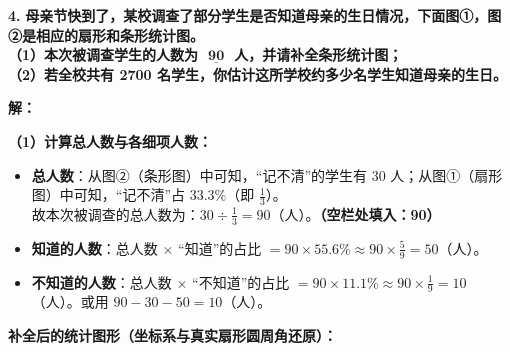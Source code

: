 \vspace{0.6cm}

\textbf{\LARGE 4.} \textbf{母亲节快到了，某校调查了部分学生是否知道母亲的生日情况，下面图①，图②是相应的扇形和条形统计图。\\
（1）本次被调查学生的人数为 $\underline{\textbf{    90    }}$ 人，并请补全条形统计图；\\
（2）若全校共有 2700 名学生，你估计这所学校约多少名学生知道母亲的生日。}

\vspace{0.4cm}
\textbf{解：}

\textbf{（1）计算总人数与各细项人数：}
\begin{itemize}
    \item \textbf{总人数}：从图②（条形图）中可知，“记不清”的学生有 $30$ 人；从图①（扇形图）中可知，“记不清”占 $33.3\%$（即 $\frac{1}{3}$）。\\
    故本次被调查的总人数为：$30 \div \frac{1}{3} = 90$（人）。\textbf{（空栏处填入：90）}
    \item \textbf{知道的人数}：总人数 $\times$ “知道”的占比 $= 90 \times 55.6\% \approx 90 \times \frac{5}{9} = 50$（人）。
    \item \textbf{不知道的人数}：总人数 $\times$ “不知道”的占比 $= 90 \times 11.1\% \approx 90 \times \frac{1}{9} = 10$（人）。或用 $90 - 30 - 50 = 10$（人）。
\end{itemize}

\textbf{补全后的统计图形（坐标系与真实扇形圆周角还原）：}

